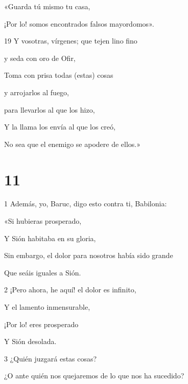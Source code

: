 \par «Guarda tú mismo tu casa,

\par ¡Por lo! somos encontrados falsos mayordomos».

\par 19 Y vosotras, vírgenes; que tejen lino fino

\par y seda con oro de Ofir,

\par Toma con prisa todas (estas) cosas

\par y arrojarlos al fuego,

\par para llevarlos al que los hizo,

\par Y la llama los envía al que los creó,

\par No sea que el enemigo se apodere de ellos.»

\chapter{11}

\par 1 Además, yo, Baruc, digo esto contra ti, Babilonia:

\par «Si hubieras prosperado,

\par Y Sión habitaba en su gloria,

\par Sin embargo, el dolor para nosotros había sido grande

\par Que seáis iguales a Sión.

\par 2 ¡Pero ahora, he aquí! el dolor es infinito,

\par Y el lamento inmensurable,

\par ¡Por lo! eres prosperado

\par Y Sión desolada.

\par 3 ¿Quién juzgará estas cosas?

\par ¿O ante quién nos quejaremos de lo que nos ha sucedido?


